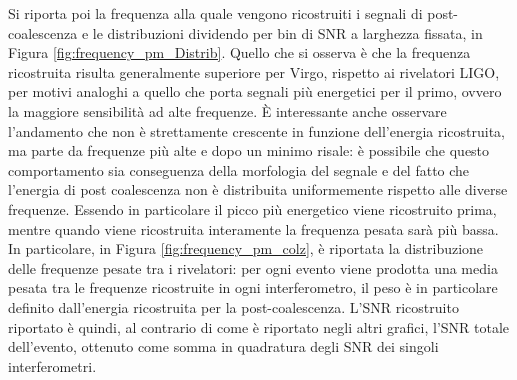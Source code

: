 Si riporta poi la frequenza alla quale vengono ricostruiti i segnali di post-coalescenza e le distribuzioni dividendo per bin di SNR a larghezza fissata, in Figura \ref{fig:frequency_pm_Distrib}. Quello che si osserva è che la frequenza ricostruita risulta generalmente superiore per Virgo, rispetto ai rivelatori LIGO, per motivi analoghi a quello che porta segnali più energetici per il primo, ovvero la maggiore sensibilità ad alte frequenze. È interessante anche osservare l'andamento che non è strettamente crescente in funzione dell'energia ricostruita, ma parte da frequenze più alte e dopo un minimo risale: è possibile che questo comportamento sia conseguenza della morfologia del segnale e del fatto che l'energia di post coalescenza non è distribuita uniformemente rispetto alle diverse frequenze. Essendo in particolare il picco più energetico viene ricostruito prima, mentre quando viene ricostruita interamente la frequenza pesata sarà più bassa.\\
In particolare, in Figura \ref{fig:frequency_pm_colz}, è riportata la distribuzione delle frequenze pesate tra i rivelatori: per ogni evento viene prodotta una media pesata tra le frequenze ricostruite in ogni interferometro, il peso è in particolare definito dall'energia ricostruita per la post-coalescenza. L'SNR ricostruito riportato è quindi, al contrario di come è riportato negli altri grafici, l'SNR totale dell'evento, ottenuto come somma in quadratura degli SNR dei singoli interferometri.\\
